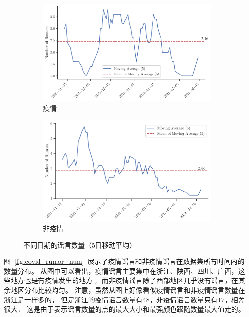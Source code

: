 \documentclass[UTF8]{ctexart}
\newcommand{\figwidth}{0.8\linewidth}
\begin{document}
\begin{figure}[!ht]
    \centering
    \begin{subfigure}[b]{0.45\textwidth}
        \centering
        \includegraphics[width=\figwidth]{../figures/covid_rumor_num_ma5}
        \caption{疫情}
        \label{subfig:covid_ma5}
    \end{subfigure}
    \hfill
    \begin{subfigure}[b]{0.45\textwidth}
        \centering
        \includegraphics[width=\figwidth]{../figures/covid_no_rumor_num_ma5}
        \caption{非疫情}
        \label{subfig:no_covid_ma5}
    \end{subfigure}
    \caption{不同日期的谣言数量（5日移动平均）}
    \label{fig:covid_ma5}
\end{figure}

图~\ref{fig:covid_rumor_num}~展示了疫情谣言和非疫情谣言在数据集所有时间内的数量分布。
从图中可以看出，疫情谣言主要集中在浙江、陕西、四川、广西，这些地方也是有疫情发生的地方；
而非疫情谣言除了西部地区几乎没有谣言，在其余地区分布比较均匀。
注意，虽然从图上好像看似疫情谣言和非疫情谣言数量在浙江是一样多的，
但是浙江的疫情谣言数量有48，非疫情谣言数量只有17，相差很大，
这是由于表示谣言数量的点的最大大小和最强颜色跟随数量最大值走的。
\end{document}
